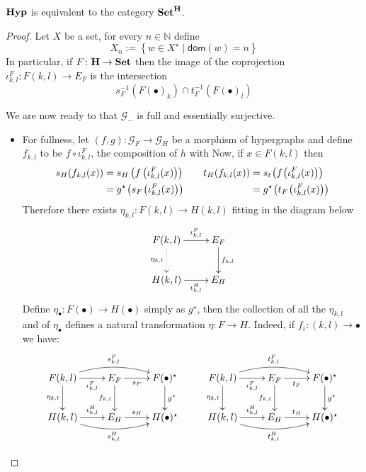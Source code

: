 \documentclass[runningheads,envcountsect]{llncs}
\newcommand{\catname}[1]{\textbf{\textup{#1}}}
\newcommand{\hyp}{\catname{Hyp}}
\newcommand{\dom}{\mathsf{dom}}
\begin{document}
\begin{proposition}
	$\hyp$ is equivalent to the category $\catname{Set}^{\catname{H}}$.
\end{proposition}
\begin{proof}
	Let $X$ be a set, for every $n\in \mathbb{N}$ define
	\[X_{n}:= \left\{w\in X^{\star} \mid \dom(w)=n\right\}\]
	In particular, if $F\colon \catname{H}\to \catname{Set}$ then the image of the coprojection $\iota^{F}_{k,l}\colon F(k,l)\to E_F$ is the intersection
	\[s^{-1}_F\left(F(\bullet)_{k}\right)\cap t^{-1}_F\left(F(\bullet)_{l}\right) \]
	
	We are now ready to that $\mathcal{G}_{-}$ is full and essentially surjective.
	\begin{itemize}
		\item For fullness, let $(f,g)\colon \mathcal{G}_F\to \mathcal{G}_{H}$ be a morphism of hypergraphs and define $f_{k,l}$ to be $f\circ \iota^F_{k,l}$, the composition of $h$ with Now, if $x\in F(k,l)$ then 
		\[\begin{split}
			s_H (f_{k,l} (x))&=s_H \left(f \left(\iota^F_{k,l} (x)\right)\right)\\&=g^{\star}\hspace{-1pt}\left(s_{F} \hspace{-1pt}\left(\iota^F_{k,l} (x)\right)\right)
		\end{split}\qquad \begin{split}
			t_H (f_{k,l} (x))&=s_t\hspace{-1pt} \left(f \hspace{-1pt}\left(\iota^F_{k,l} (x)\right)\right)\\&=g^{\star}\hspace{-1pt} \left(t_{F}\hspace{-1pt} \left(\iota^F_{k,l} (x)\right)\right)
		\end{split}\]
		Therefore there exists $\eta_{k,l}\colon F(k,l)\to H(k,l)$ fitting in the diagram below
		\[\xymatrix{F(k,l) \ar[r]^-{\iota^{F}_{k,l}} \ar@{.>}[d]_{\eta_{k,l}}& E_F \ar[d]^{f_{k,l}}\\ H(k,l) \ar[r]_-{\iota^{H}_{k,l}}& E_H}\]
		Define $\eta_{\bullet}\colon F(\bullet)\to H(\bullet)$ simply as $g^\star$, then  the collection of all the $\eta_{k,l}$ and of $\eta_\bullet$ defines a natural transformation $\eta\colon F\to H$. Indeed, if $f_i\colon (k,l)\to \bullet$ we have:
		\[\xymatrix{F(k,l) \ar@/^.4cm/[rr]^{s^F_{k,l}} \ar[r]_-{\iota^{F}_{k,l}} \ar[d]_{\eta_{k,l}}& E_F \ar[d]_{f_{k,l}} \ar[r]_-{s_F}& F(\bullet)^\star \ar[d]^{g^\star}&F(k,l) \ar@/^.4cm/[rr]^{t^F_{k,l}}\ar[r]_-{\iota^{F}_{k,l}} \ar[d]_{\eta_{k,l}}& E_F \ar[d]_{f_{k,l}} \ar[r]_-{t_F}& F(\bullet)^\star \ar[d]^{g^\star}\\ H(k,l) \ar@/_.4cm/[rr]_{s^H_{k,l}} \ar[r]^-{\iota^{H}_{k,l}}& E_H \ar[r]^-{s_H}& H(\bullet)^\star& H(k,l) \ar@/_.4cm/[rr]_{t^H_{k,l}} \ar[r]^-{\iota^{H}_{k,l}}& E_H \ar[r]^-{t_H}& H(\bullet)^\star}\]

\end{itemize}
\end{proof}
\end{document}
